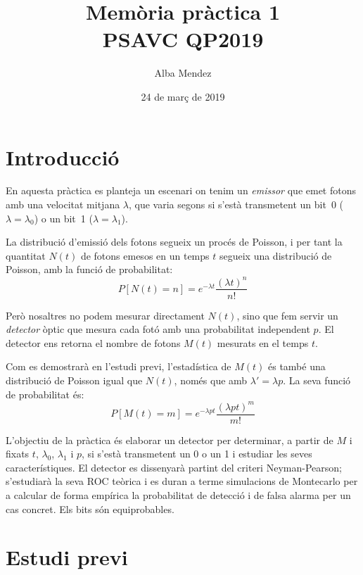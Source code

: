\documentclass[catalan]{scrartcl}
\author{Alba Mendez}
\title{Memòria pràctica 1\\
{\small PSAVC QP2019}}
\date{24 de març de 2019}
\begin{document}
\maketitle


\part{Introducció}

En aquesta pràctica es planteja un escenari on tenim un \emph{emissor}
que emet fotons amb una velocitat mitjana $\lambda$, que varia segons
si s'està transmetent un bit~0 ($\lambda = \lambda_0$) o un bit~1
($\lambda = \lambda_1$).

La distribució d'emissió dels fotons segueix un procés de Poisson, i per
tant la quantitat $N(t)$ de fotons emesos en un temps $t$ segueix una
distribució de Poisson, amb la funció de probabilitat:
%
\begin{equation}
  P[N(t) = n] = e^{-\lambda t} \frac{\left(\lambda t\right)^n}{n!}
\end{equation}

Però nosaltres no podem mesurar directament $N(t)$, sino que fem servir
un \emph{detector} òptic que mesura cada fotó amb una probabilitat
independent $p$. El detector ens retorna el nombre de fotons $M(t)$
mesurats en el temps $t$.

Com es demostrarà en l'estudi previ, l'estadística de $M(t)$ és també
una distribució de Poisson igual que $N(t)$, només que amb
$\lambda' = \lambda p$. La seva funció de probabilitat és:
%
\begin{equation}
  P[M(t) = m] = e^{-\lambda p t} \frac{\left(\lambda p t\right)^m}{m!}
\end{equation}

L'objectiu de la pràctica és elaborar un detector per determinar, a partir
de $M$ i fixats $t$, $\lambda_0$, $\lambda_1$ i $p$, si s'està transmetent
un 0 o un 1 i estudiar les seves característiques. El detector es dissenyarà
partint del criteri Neyman-Pearson; s'estudiarà la seva ROC teòrica i es
duran a terme simulacions de Montecarlo per a calcular de forma empírica la
probabilitat de detecció i de falsa alarma per un cas concret. Els bits són
equiprobables.


\part{Estudi previ}
\end{document}
